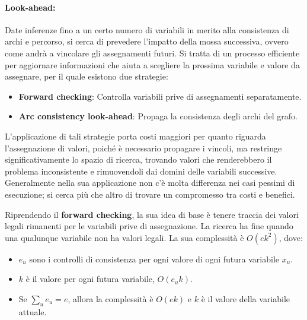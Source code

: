 \paragraph{Look-ahead:} Date inferenze fino a un certo numero di variabili in merito alla consistenza di archi e percorso, si cerca di prevedere
l'impatto della mossa successiva, ovvero come andrà a vincolare gli assegnamenti futuri. Si tratta di un processo efficiente per aggiornare informazioni
che aiuta a scegliere la prossima variabile e valore da assegnare, per il quale esistono due strategie: \begin{itemize}
	\item \textbf{Forward checking}: Controlla variabili prive di assegnamenti separatamente.
	\item \textbf{Arc consistency look-ahead}: Propaga la consistenza degli archi del grafo.
\end{itemize}

\noindent L'applicazione di tali strategie porta costi maggiori per quanto riguarda l'assegnazione di valori, poiché è necessario propagare i vincoli,
ma restringe significativamente lo spazio di ricerca, trovando valori che renderebbero il problema inconsistente e rimuovendoli dai domini delle
variabili successive. Generalmente nella sua applicazione non c'è molta differenza nei casi pessimi di esecuzione; si cerca più che altro di trovare un
compromesso tra costi e benefici.\par
Riprendendo il \textbf{forward checking}, la sua idea di base è tenere traccia dei valori legali rimanenti per le variabili prive di assegnazione. La
ricerca ha fine quando una qualunque variabile non ha valori legali. La sua complessità è $O(ek^2)$, dove: \begin{itemize}
	\item $e_u$ sono i controlli di consistenza per ogni valore di ogni futura variabile $x_u$.
	\item $k$ è il valore per ogni futura variabile, $O(e_uk)$.
	\item Se $\sum_u e_u = e$, allora la complessità è $O(ek)$ e $k$ è il valore della variabile attuale.
\end{itemize}

